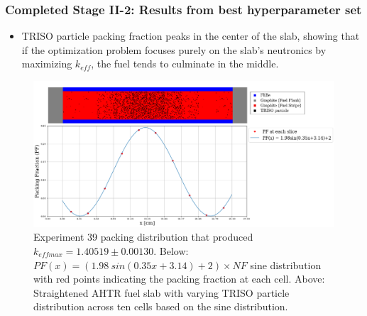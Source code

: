 \begin{frame}
    \frametitle{Completed Stage II-2: Results from best hyperparameter set}
    \begin{itemize}
        \item TRISO particle packing fraction peaks in the center 
        of the slab, showing that if the optimization problem focuses purely on the 
        slab's neutronics by maximizing $k_{eff}$, the fuel tends to culminate in the 
        middle. 
    \end{itemize}
    \vspace{-0.2cm}
    \begin{figure}[]
        \centering
        \includegraphics[width=0.7\linewidth]{../docs/figures/triso_distribution_sine_39.png} 
        \vspace{-0.2cm}
        \caption{Experiment 39 packing distribution that produced $k_{eff max} = 1.40519 \pm 0.00130$. 
        Below: $PF(x) = (1.98\ sin(0.35x+3.14)+2)  \times NF$ sine distribution with 
        red points indicating the packing fraction at each cell. 
        Above: Straightened AHTR fuel slab with varying TRISO particle 
        distribution across ten cells based on the sine distribution. }
        \label{fig:triso_distribution_sine_39}
    \end{figure}
\end{frame}